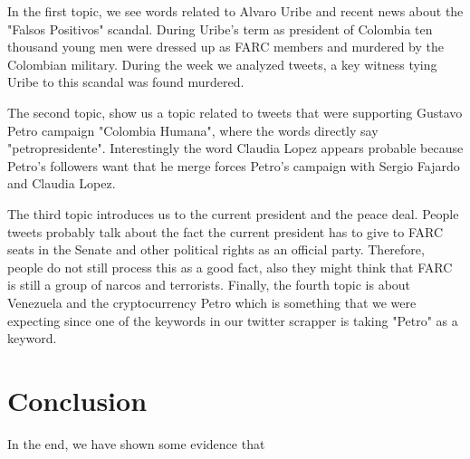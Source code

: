 \documentclass[10pt,a4paper]{article} %
\begin{document}
In the first topic, we see words related to Alvaro Uribe and recent news about the "Falsos Positivos" scandal.  During Uribe's term as president of Colombia ten thousand young men were dressed up as FARC members and murdered by the Colombian military.  During the week we analyzed tweets, a key witness tying Uribe to this scandal was found murdered.

The second topic, show us a topic related to tweets that were supporting Gustavo Petro campaign "Colombia Humana", where the words directly say "petropresidente". Interestingly the word Claudia Lopez appears probable because Petro's followers want that he merge forces Petro's campaign with Sergio Fajardo and Claudia Lopez.

The third topic introduces us to the current president and the peace deal. People tweets probably talk about the fact the current president has to give to FARC seats in the Senate and other political rights as an official party. Therefore, people do not still process this as a good fact, also they might think that FARC is still a group of narcos and terrorists. Finally, the fourth topic is about Venezuela and the cryptocurrency Petro which is something that we were expecting since one of the keywords in our twitter scrapper is taking "Petro" as a keyword.


		
	\section{Conclusion}
	
	In the end, we have shown some evidence that
	
	\nocite{*}
	
	
\end{document}
